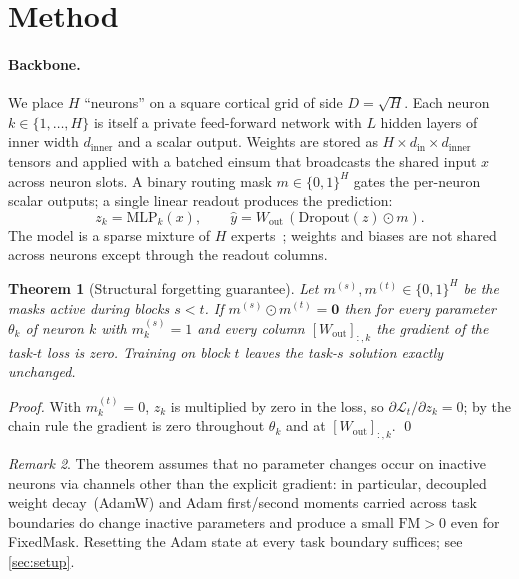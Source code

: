 \documentclass{article}
\theoremstyle{plain}
\newtheorem{theorem}{Theorem}[section]
\theoremstyle{remark}
\newtheorem{remark}[theorem]{Remark}
\begin{document}
\section{Method}
\label{sec:method}

\paragraph{Backbone.}
We place $H$ ``neurons'' on a square cortical grid of side $D=\sqrt{H}$. Each neuron $k\in\{1,\ldots,H\}$ is itself a private feed-forward network with $L$ hidden layers of inner width $d_\mathrm{inner}$ and a scalar output. Weights are stored as $H\times d_\mathrm{in}\times d_\mathrm{inner}$ tensors and applied with a batched einsum that broadcasts the shared input $x$ across neuron slots. A binary routing mask $m\in\{0,1\}^H$ gates the per-neuron scalar outputs; a single linear readout produces the prediction:
\[
  z_k = \mathrm{MLP}_k(x), \qquad \hat y = W_\mathrm{out}\,(\mathrm{Dropout}(z)\odot m).
\]
The model is a sparse mixture of $H$ experts~\citep{shazeer2017outrageously}; weights and biases are not shared across neurons except through the readout columns.

\begin{theorem}[Structural forgetting guarantee]
\label{thm:isolation}
Let $m^{(s)},m^{(t)}\in\{0,1\}^H$ be the masks active during blocks $s<t$. If $m^{(s)}\odot m^{(t)}=\mathbf{0}$ then for every parameter $\theta_k$ of neuron $k$ with $m^{(s)}_k=1$ and every column $[W_\mathrm{out}]_{:,k}$ the gradient of the task-$t$ loss is zero. Training on block $t$ leaves the task-$s$ solution exactly unchanged.
\end{theorem}
\begin{proof}
With $m^{(t)}_k=0$, $z_k$ is multiplied by zero in the loss, so $\partial\mathcal{L}_t/\partial z_k=0$; by the chain rule the gradient is zero throughout $\theta_k$ and at $[W_\mathrm{out}]_{:,k}$. \qed
\end{proof}
\begin{remark}\label{rem:caveats}
The theorem assumes that no parameter changes occur on inactive neurons via channels other than the explicit gradient: in particular, decoupled weight decay~(AdamW) and Adam first/second moments carried across task boundaries do change inactive parameters and produce a small $\mathrm{FM}>0$ even for FixedMask. Resetting the Adam state at every task boundary suffices; see \cref{sec:setup}.
\end{remark}
\end{document}

